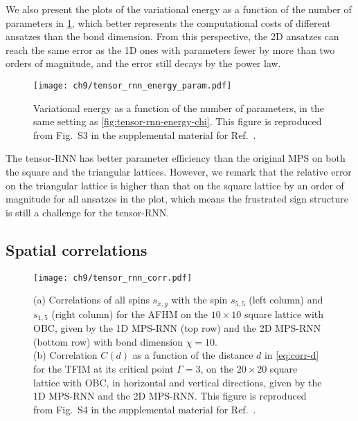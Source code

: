 We also present the plots of the variational energy as a function of the number of parameters in \cref{fig:tensor-rnn-energy-param}, which better represents the computational costs of different ansatzes than the bond dimension. From this perspective, the 2D ansatzes can reach the same error as the 1D ones with parameters fewer by more than two orders of magnitude, and the error still decays by the power law.

\begin{figure}[htb]
\centering
\hspace*{-0.05\linewidth}
\texttt{[image: ch9/tensor\_rnn\_energy\_param.pdf]}
\caption[Variational energy vs. number of parameters for tensor-RNN]{
Variational energy as a function of the number of parameters, in the same setting as \cref{fig:tensor-rnn-energy-chi}.
This figure is reproduced from Fig.~S3 in the supplemental material for Ref.~\cite{wu2023tensor}.
}
\label{fig:tensor-rnn-energy-param}
\end{figure}

The tensor-RNN has better parameter efficiency than the original MPS on both the square and the triangular lattices. However, we remark that the relative error on the triangular lattice is higher than that on the square lattice by an order of magnitude for all ansatzes in the plot, which means the frustrated sign structure is still a challenge for the tensor-RNN.

\subsection{Spatial correlations}
\label{sec:tensor-rnn-corr}

\begin{figure}[!b]
\centering
\hspace*{-0.05\linewidth}
\texttt{[image: ch9/tensor\_rnn\_corr.pdf]}
\caption[Spin correlations in MPS-RNN]{
(a) Correlations of all spins $s_{x, y}$ with the spin $s_{5, 5}$ (left column) and $s_{1, 5}$ (right column) for the AFHM on the $10 \times 10$ square lattice with OBC, given by the 1D MPS-RNN (top row) and the 2D MPS-RNN (bottom row) with bond dimension $\chi = 10$. \\
(b) Correlation $C(d)$ as a function of the distance $d$ in \cref{eq:corr-d} for the TFIM at its critical point $\Gamma = 3$, on the $20 \times 20$ square lattice with OBC, in horizontal and vertical directions, given by the 1D MPS-RNN and the 2D MPS-RNN.
This figure is reproduced from Fig.~S4 in the supplemental material for Ref.~\cite{wu2023tensor}.
}
\label{fig:tensor-rnn-corr}
\end{figure}


